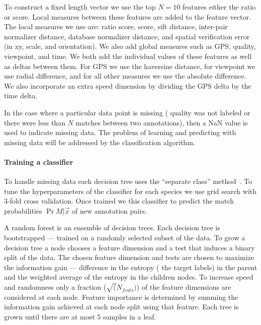 To construct a fixed length vector we use the top $N=10$ features \wrt{}
  either the ratio or \LNBNN{} score.
Local measures between these features are added to the feature vector.
The local measures we use are:
ratio score, \LNBNN{} score, sift distance, inter-pair normalizer distance,
  database normalizer distance, and spatial verification error (in xy, scale,
  and orientation).
We also add global measures such as GPS, quality, viewpoint, and time.
We both add the individual values of these features as well as deltas between
  them.
For GPS we use the haversine distance, for viewpoint we use radial difference,
  and for all other measures we use the absolute difference.
We also incorporate an extra speed dimension by dividing the GPS delta by the
  time delta.

In the case where a particular data point is missing (\ie{} quality was not
  labeled or there were less than $N$ matches between two annotations), then a
  NaN value is used to indicate missing data.
The problem of learning and predicting with missing data will be addressed by
  the classification algorithm.



\paragraph{Training a classifier}
To handle missing data each decision tree uses the ``separate class''
  method~\cite{ding_investigation_2010}.
To tune the hyperparameters of the classifier for each species we use grid
  search with $3$-fold cross validation.
Once trained we this classifier to predict the match probabilities $\Pr{M |
  \vec{x}}$ of new annotation pairs.


A random forest is an ensemble of decision trees.
Each decision tree is bootstrapped --- \ie{} trained on a randomly selected
  subset of the data.
To grow a decision tree a node chooses a feature dimension and a test that
  induces a binary split of the data.
The chosen feature dimension and tests are chosen to maximize the information
  gain --- \ie{} difference in the entropy (\wrt{} the target labels) in the
  parent and the weighted average of the entropy in the children nodes.
To increase speed and randomness only a fraction ($\sqrt(N_{feats})$) of the
  feature dimensions are considered at each node.
Feature importance is determined by summing the information gain achieved at
  each node split using that feature.
Each tree is grown until there are at most $5$ samples in a leaf.

